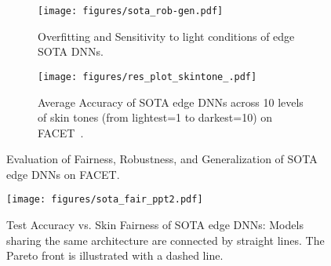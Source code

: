 \begin{figure}
\centering
\begin{subfigure}[b]{0.48\linewidth}
\texttt{[image: figures/sota\_rob-gen.pdf]}
    \caption{Overfitting and Sensitivity to light conditions of edge SOTA DNNs.}
    \label{fig:sota_rob}
    \end{subfigure}
\hfill
\begin{subfigure}[b]{0.48\linewidth}
\texttt{[image: figures/res\_plot\_skintone\_.pdf]}
    \caption{Average Accuracy of SOTA edge DNNs across 10 levels of skin tones (from lightest=1 to darkest=10) on FACET~\cite{gustafson2023facet}. }
    \label{fig:sota_fair}
\end{subfigure} 
    \caption{Evaluation of Fairness, Robustness, and Generalization of SOTA edge DNNs on FACET.}
    \label{fig:sota}
\end{figure}








\begin{figure}
    \centering
    \texttt{[image: figures/sota\_fair\_ppt2.pdf]}
    \caption{Test Accuracy vs. Skin Fairness of SOTA edge DNNs: Models sharing the same architecture are connected by straight lines. The Pareto front is illustrated with a dashed line. }
    \label{fig:sota_graph}
\end{figure}

